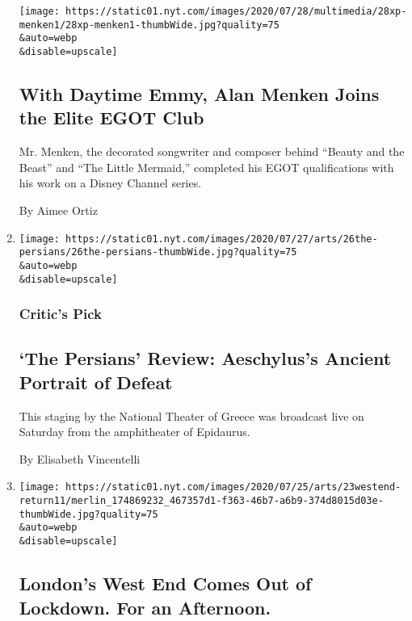 \begin{enumerate}
  \texttt{[image: https://static01.nyt.com/images/2020/07/28/multimedia/28xp-menken1/28xp-menken1-thumbWide.jpg?quality=75\\\&auto=webp\\\&disable=upscale]}

  \hypertarget{with-daytime-emmy-alan-menken-joins-the-elite-egot-club}{%
  \subsection{With Daytime Emmy, Alan Menken Joins the Elite EGOT
  Club}\label{with-daytime-emmy-alan-menken-joins-the-elite-egot-club}}

  Mr. Menken, the decorated songwriter and composer behind ``Beauty and
  the Beast'' and ``The Little Mermaid,'' completed his EGOT
  qualifications with his work on a Disney Channel series.

  By Aimee Ortiz
\item
  \href{/2020/07/26/theater/the-persians-review-aeschylus.html}{}

  \texttt{[image: https://static01.nyt.com/images/2020/07/27/arts/26the-persians/26the-persians-thumbWide.jpg?quality=75\\\&auto=webp\\\&disable=upscale]}

  \hypertarget{critics-pick-1}{%
  \subsubsection{Critic's Pick}\label{critics-pick-1}}

  \hypertarget{the-persians-review-aeschyluss-ancient-portrait-of-defeat}{%
  \subsection{`The Persians' Review: Aeschylus's Ancient Portrait of
  Defeat}\label{the-persians-review-aeschyluss-ancient-portrait-of-defeat}}

  This staging by the National Theater of Greece was broadcast live on
  Saturday from the amphitheater of Epidaurus.

  By Elisabeth Vincentelli
\item
  \href{/2020/07/23/theater/west-end-london-virus.html}{}

  \texttt{[image: https://static01.nyt.com/images/2020/07/25/arts/23westend-return11/merlin\_174869232\_467357d1-f363-46b7-a6b9-374d8015d03e-thumbWide.jpg?quality=75\\\&auto=webp\\\&disable=upscale]}

  \hypertarget{londons-west-end-comes-out-of-lockdown-for-an-afternoon}{%
  \subsection{London's West End Comes Out of Lockdown. For an
  Afternoon.}\label{londons-west-end-comes-out-of-lockdown-for-an-afternoon}}


\end{enumerate}
